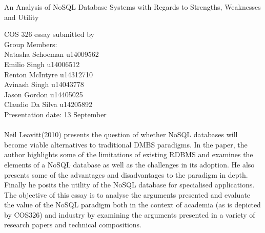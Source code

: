 \documentclass[12pt]{article}
\begin{document}
\begin{titlepage}

\begin{center}
\begin{Huge}
An Analysis of NoSQL Database Systems with Regards to Strengths, Weaknesses and Utility
\begin{large}
\begin{center}
COS 326 essay submitted by
\\
Group Members:\\
Natasha Schoeman u14009562
\\
Emilio Singh u14006512
\\
Renton McIntyre u14312710
\\
Avinash Singh u14043778
\\
Jason Gordon u14405025 
\\
Claudio Da Silva u14205892 
\\
Presentation date: 13 September

\end{center}
\end{large}
\end{Huge}

\end{center}
\end{titlepage}
\pagebreak

\paragraph{}
Neil Leavitt(2010) presents the question of whether NoSQL databases will become viable alternatives to traditional DMBS paradigms. In the paper, the author highlights some of the limitations of existing RDBMS and examines the elements of a NoSQL database as well as the challenges in its adoption. He also presents some of the advantages and disadvantages to the paradigm in depth. Finally he posits the utility of the NoSQL database for specialised applications. The objective of this essay is to analyse the arguments presented and evaluate the value of the NoSQL paradigm both in the context of academia (as is depicted by COS326) and industry by examining the arguments presented in a variety of research papers and technical compositions.
\end{document}
